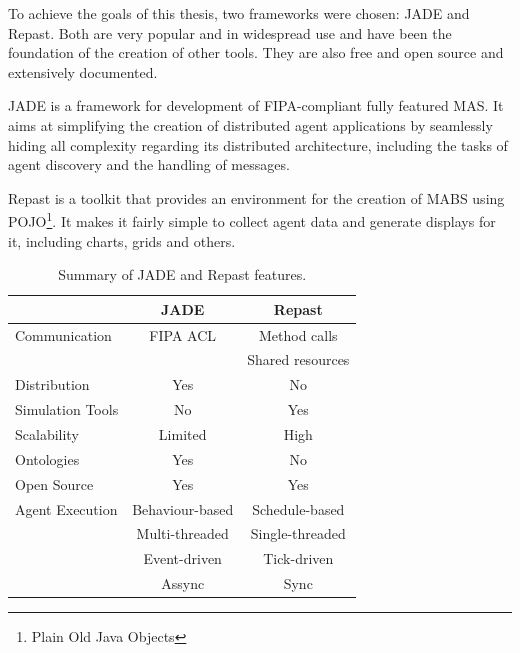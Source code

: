 To achieve the goals of this thesis, two frameworks were chosen: JADE and Repast. Both are very popular and in widespread use and have been the foundation of the creation of other tools. They are also free and open source and extensively documented.

JADE is a framework for development of FIPA-compliant fully featured MAS. It aims at simplifying the creation of distributed agent applications by seamlessly hiding all complexity regarding its distributed architecture, including the tasks of agent discovery and the handling of messages.

Repast is a toolkit that provides an environment for the creation of MABS using POJO\footnote{Plain Old Java Objects}. It makes it fairly simple to collect agent data and generate displays for it, including charts, grids and others.


\begin{table}[h]
	\caption{Summary of JADE and Repast features.}
	\label{tab:jadevsrep}
	\begin{center}
		\begin{tabular}{l|cc}
		\hline

		\hline
		\textbf{} & \textbf{JADE} & \textbf{Repast} \\ %
		\hline
			Communication & FIPA ACL &  Method calls  \\ %
						  &			 &  Shared resources \\
		\hline
			Distribution & Yes & No \\ %
		\hline
			Simulation Tools & No & Yes \\ %
		\hline
			Scalability & Limited & High \\ %
		\hline
			Ontologies & Yes & No \\ %
		\hline
			Open Source & Yes & Yes \\ %
		\hline
			Agent Execution & Behaviour-based & Schedule-based  \\ %
							& Multi-threaded & Single-threaded \\ %
							& Event-driven   & Tick-driven 	   \\ %
							& Assync		 & Sync 		   \\ %
		\hline
		\end{tabular}
	\end{center}
\end{table}

